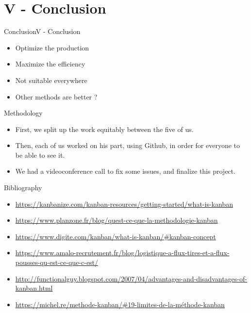 \documentclass[10pt]{beamer}
\newcommand{\PV}{V - Conclusion}
\begin{document}
\section{\PV} 


\begin{frame}{Conclusion}{\PV}
    \begin{itemize}
        \item Optimize the production
        \item Maximize the efficiency
        \item Not suitable everywhere
        \item Other methods are better ?
    \end{itemize}
\end{frame}


\begin{frame}{Methodology}
    \begin{itemize}
        \item First, we split up the work equitably between the five of us.
        \item Then, each of us worked on his part, using Github, in order for everyone to be able to see it.
        \item We had a videoconference call to fix some issues, and finalize this project.
    \end{itemize}
\end{frame}


\begin{frame}{Bibliography}
    \begin{itemize}
        \item \href{https://kanbanize.com/kanban-resources/getting-started/what-is-kanban}{https://kanbanize.com/kanban-resources/getting-started/what-is-kanban}
        \item \href{https://www.planzone.fr/blog/quest-ce-que-la-methodologie-kanban}{https://www.planzone.fr/blog/quest-ce-que-la-methodologie-kanban}
        \item \href{https://www.digite.com/kanban/what-is-kanban/\#kanban-concept}{https://www.digite.com/kanban/what-is-kanban/\#kanban-concept}
        \item \href{https://www.amalo-recrutement.fr/blog/logistique-a-flux-tires-et-a-flux-pousses-qu-est-ce-que-c-est/}{https://www.amalo-recrutement.fr/blog/logistique-a-flux-tires-et-a-flux-pousses-qu-est-ce-que-c-est/}
        \item \href{http://functionalguy.blogspot.com/2007/04/advantages-and-disadvantages-of-kanban.html}{http://functionalguy.blogspot.com/2007/04/advantages-and-disadvantages-of-kanban.html}
        \item \href{https://michel.re/methode-kanban/\#19-limites-de-la-méthode-kanban}{https://michel.re/methode-kanban/\#19-limites-de-la-méthode-kanban}
    \end{itemize}
\end{frame}
\end{document}
